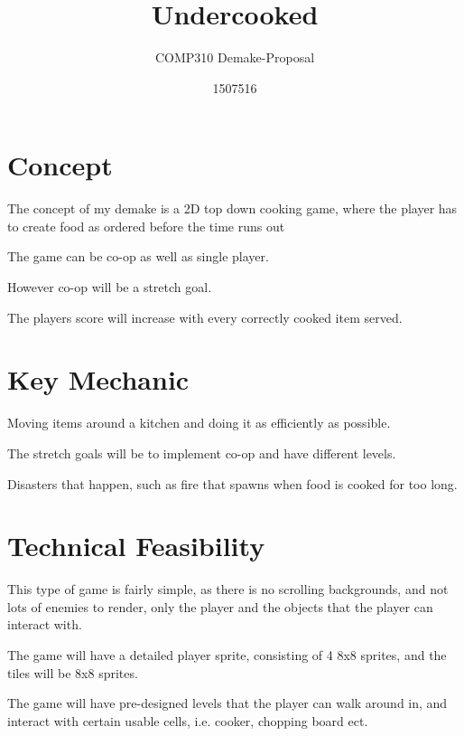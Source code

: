 \documentclass{scrartcl}
\title{Undercooked}
\subtitle{COMP310 Demake-Proposal}
\author{1507516}
\begin{document}
\maketitle

\abstract{}

\section{Concept}
The concept of my demake is a 2D top down cooking game, where the player has to create food as ordered before the time runs out

The game can be co-op as well as single player.

However co-op will be a stretch goal.

The players score will increase with every correctly cooked item served. 
\section{Key Mechanic}
Moving items around a kitchen and doing it as efficiently as possible.

The stretch goals will be to implement co-op and have different levels.

Disasters that happen, such as fire that spawns when food is cooked for too long.
\section{Technical Feasibility}
This type of game is fairly simple, as there is no scrolling backgrounds, and not lots of enemies to render, only the player and the objects that the player can interact with.

The game will have a detailed player sprite, consisting of 4 8x8 sprites, and the tiles will be 8x8 sprites.

The game will have pre-designed levels that the player can walk around in, and interact with certain usable cells, i.e. cooker, chopping board ect.
\end{document}

